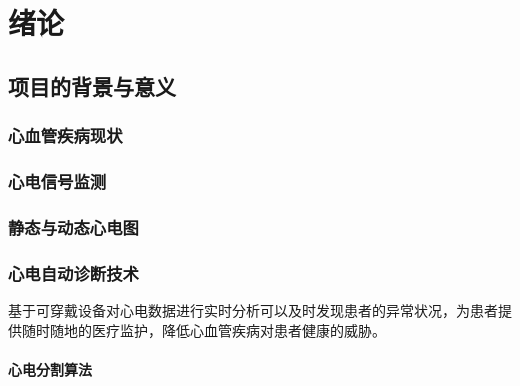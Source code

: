 \documentclass{ecnuthesis}
\begin{document}
    \frontmatter

    \begin{abstract}
    \end{abstract}

    \begin{abstractEN}
    \end{abstractEN}

    \mainmatter


    \chapter{绪论}\label{ch:intro}


    \section{项目的背景与意义}\label{sec:background}

    \subsection{心血管疾病现状}\label{subsec:disease}

    \subsection{心电信号监测}\label{subsec:monitoring}

    \subsection{静态与动态心电图}\label{subsec:static-dynamic}

    \subsection{心电自动诊断技术}\label{subsec:diagnosis}

    基于可穿戴设备对心电数据进行实时分析可以及时发现患者的异常状况，为患者提供随时随地的医疗监护，降低心血管疾病对患者健康的威胁。

    \subsubsection{心电分割算法}\label{subsubsec:segmentation}
\end{document}
